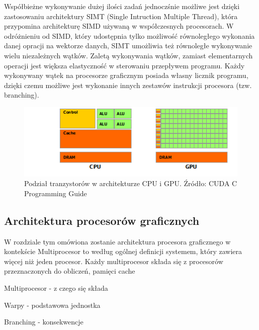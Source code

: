 Współbieżne wykonywanie dużej ilości zadań jednoczśnie możliwe jest dzięki 
zastosowaniu architektury SIMT (Single Intruction Multiple Thread), która
przypomina architekturę SIMD używaną w współczesnych procesorach. W
odróżnieniu od SIMD, który udostępnia tylko możliwość równoległego wykonania danej
opracji na wektorze danych, SIMT umożliwia też równoległe wykonywanie wielu
niezależnych wątków. Zaletą wykonywania wątków, zamiast elementarnych operacji jest większa
elastyczność w sterowaniu przepływem programu. Każdy wykonywany wątek
na procesorze graficznym posiada własny licznik programu, dzięki czemu możliwe
jest wykonanie innych zestawów instrukcji procesora (tzw. branching).

\begin{figure}[ht]\label{cpugpu}
\centering
\includegraphics{images/gpu-devotes-more-transistors-to-data-processing.png}
\caption{Podział tranzystorów w architekturze CPU i GPU. Źródło: CUDA C Programming Guide}
\end{figure}

\subsection{Architektura procesorów graficznych}

W rozdziale tym omówiona zostanie architektura procesora graficznego
w kontekście 
Multiprocesor to według ogólnej definicji systemem, który zawiera więcej niż
jeden procesor\cite{multi}. Każdy multiprocesor składa się z procesorów
przeznaczonych do obliczeń, pamięci cache

Multiprocesor - z czego się składa 

Warpy - podstawowa jednostka

Branching - konsekwencje

